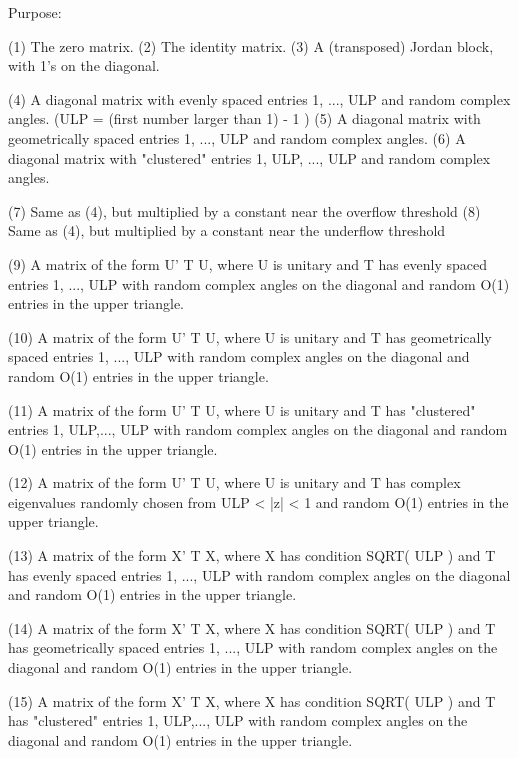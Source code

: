 \begin{DoxyParagraph}{Purpose\+: }
\begin{DoxyVerb}
    (1)  The zero matrix.
    (2)  The identity matrix.
    (3)  A (transposed) Jordan block, with 1's on the diagonal.

    (4)  A diagonal matrix with evenly spaced entries
         1, ..., ULP  and random complex angles.
         (ULP = (first number larger than 1) - 1 )
    (5)  A diagonal matrix with geometrically spaced entries
         1, ..., ULP  and random complex angles.
    (6)  A diagonal matrix with "clustered" entries 1, ULP, ..., ULP
         and random complex angles.

    (7)  Same as (4), but multiplied by a constant near
         the overflow threshold
    (8)  Same as (4), but multiplied by a constant near
         the underflow threshold

    (9)  A matrix of the form  U' T U, where U is unitary and
         T has evenly spaced entries 1, ..., ULP with random complex
         angles on the diagonal and random O(1) entries in the upper
         triangle.

    (10) A matrix of the form  U' T U, where U is unitary and
         T has geometrically spaced entries 1, ..., ULP with random
         complex angles on the diagonal and random O(1) entries in
         the upper triangle.

    (11) A matrix of the form  U' T U, where U is unitary and
         T has "clustered" entries 1, ULP,..., ULP with random
         complex angles on the diagonal and random O(1) entries in
         the upper triangle.

    (12) A matrix of the form  U' T U, where U is unitary and
         T has complex eigenvalues randomly chosen from
         ULP < |z| < 1   and random O(1) entries in the upper
         triangle.

    (13) A matrix of the form  X' T X, where X has condition
         SQRT( ULP ) and T has evenly spaced entries 1, ..., ULP
         with random complex angles on the diagonal and random O(1)
         entries in the upper triangle.

    (14) A matrix of the form  X' T X, where X has condition
         SQRT( ULP ) and T has geometrically spaced entries
         1, ..., ULP with random complex angles on the diagonal
         and random O(1) entries in the upper triangle.

    (15) A matrix of the form  X' T X, where X has condition
         SQRT( ULP ) and T has "clustered" entries 1, ULP,..., ULP
         with random complex angles on the diagonal and random O(1)
         entries in the upper triangle.


\end{DoxyVerb}
\end{DoxyParagraph}
